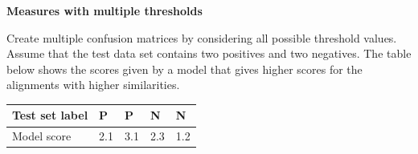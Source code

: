 \question \textbf{Measures with multiple thresholds}
  
Create multiple confusion matrices by considering all possible threshold values. Assume that the test data set contains two positives and two negatives. The table below shows the scores given by a model that gives higher scores for the alignments with higher similarities. 

\begin{table}[H]
\centering
\begin{tabular}{|l|l|l|l|l|}
\hline
Test set label & P   & P   & N   & N   \\ \hline
Model score    & 2.1 & 3.1 & 2.3 & 1.2 \\ \hline
\end{tabular}
\end{table}

\vspace{0.1 in}

